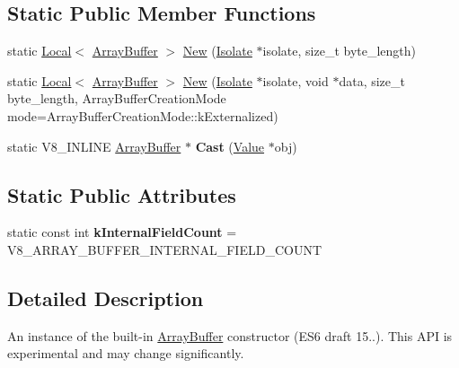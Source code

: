 \subsection*{Static Public Member Functions}
\begin{DoxyCompactItemize}
\item 
static \hyperlink{classv8_1_1Local}{Local}$<$ \hyperlink{classv8_1_1ArrayBuffer}{Array\+Buffer} $>$ \hyperlink{classv8_1_1ArrayBuffer_ad752e03d7cc7fe863656ad6183785ab7}{New} (\hyperlink{classv8_1_1Isolate}{Isolate} $\ast$isolate, size\+\_\+t byte\+\_\+length)
\item 
static \hyperlink{classv8_1_1Local}{Local}$<$ \hyperlink{classv8_1_1ArrayBuffer}{Array\+Buffer} $>$ \hyperlink{classv8_1_1ArrayBuffer_acc65e714766b0d0d791b0d43ec52d0bb}{New} (\hyperlink{classv8_1_1Isolate}{Isolate} $\ast$isolate, void $\ast$data, size\+\_\+t byte\+\_\+length, Array\+Buffer\+Creation\+Mode mode=Array\+Buffer\+Creation\+Mode\+::k\+Externalized)
\item 
\hypertarget{classv8_1_1ArrayBuffer_a4b0a703ae34217507a8ebc9cabf7336a}{}static V8\+\_\+\+I\+N\+L\+I\+N\+E \hyperlink{classv8_1_1ArrayBuffer}{Array\+Buffer} $\ast$ {\bfseries Cast} (\hyperlink{classv8_1_1Value}{Value} $\ast$obj)\label{classv8_1_1ArrayBuffer_a4b0a703ae34217507a8ebc9cabf7336a}

\end{DoxyCompactItemize}
\subsection*{Static Public Attributes}
\begin{DoxyCompactItemize}
\item 
\hypertarget{classv8_1_1ArrayBuffer_af49000a2ea120e49da846ef02a42ac69}{}static const int {\bfseries k\+Internal\+Field\+Count} = V8\+\_\+\+A\+R\+R\+A\+Y\+\_\+\+B\+U\+F\+F\+E\+R\+\_\+\+I\+N\+T\+E\+R\+N\+A\+L\+\_\+\+F\+I\+E\+L\+D\+\_\+\+C\+O\+U\+N\+T\label{classv8_1_1ArrayBuffer_af49000a2ea120e49da846ef02a42ac69}

\end{DoxyCompactItemize}


\subsection{Detailed Description}
An instance of the built-\/in \hyperlink{classv8_1_1ArrayBuffer}{Array\+Buffer} constructor (E\+S6 draft 15..). This A\+P\+I is experimental and may change significantly. 

